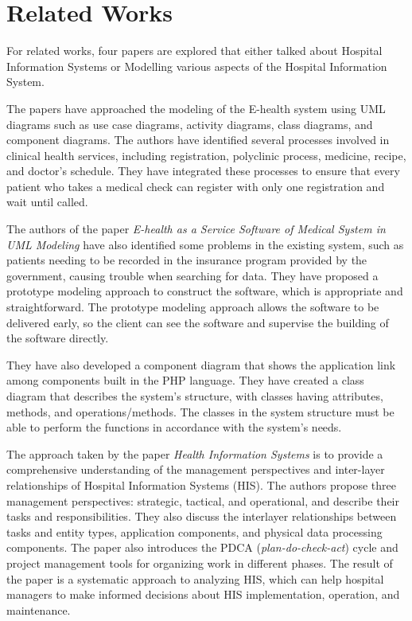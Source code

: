 \chapter{Related Works}
For related works, four papers are explored that either talked about Hospital Information Systems or Modelling various aspects of the Hospital Information System. 

The papers have approached the modeling of the E-health system using UML diagrams such as use case diagrams, activity diagrams, class diagrams, and component diagrams. The authors have identified several processes involved in clinical health services, including registration, polyclinic process, medicine, recipe, and doctor's schedule. They have integrated these processes to ensure that every patient who takes a medical check can register with only one registration and wait until called. 

The authors of the paper \textit{E-health as a Service Software of Medical System in UML
Modeling} have also identified some problems in the existing system, such as patients needing to be recorded in the insurance program provided by the government, causing trouble when searching for data. They have proposed a prototype modeling approach to construct the software, which is appropriate and straightforward. The prototype modeling approach allows the software to be delivered early, so the client can see the software and supervise the building of the software directly. 

They have also developed a component diagram that shows the application link among components built in the PHP language. They have created a class diagram that describes the system's structure, with classes having attributes, methods, and operations/methods. The classes in the system structure must be able to perform the functions in accordance with the system's needs. \cite{EHS}

The approach taken by the paper \textit{Health Information Systems} is to provide a comprehensive understanding of the management perspectives and inter-layer relationships of Hospital Information Systems (HIS). The authors propose three management perspectives: strategic, tactical, and operational, and describe their tasks and responsibilities. They also discuss the interlayer relationships between tasks and entity types, application components, and physical data processing components. The paper also introduces the PDCA (\textit{plan-do-check-act}) cycle and project management tools for organizing work in different phases. The result of the paper is a systematic approach to analyzing HIS, which can help hospital managers to make informed decisions about HIS implementation, operation, and maintenance.\cite{HIS}

